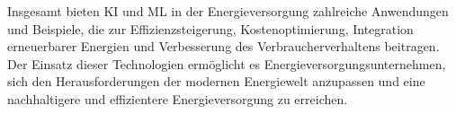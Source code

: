 Insgesamt bieten KI und ML in der Energieversorgung zahlreiche Anwendungen und
Beispiele, die zur Effizienzsteigerung, Kostenoptimierung, Integration
erneuerbarer Energien und Verbesserung des Verbraucherverhaltens beitragen. Der
Einsatz dieser Technologien ermöglicht es Energieversorgungsunternehmen, sich
den Herausforderungen der modernen Energiewelt anzupassen und eine
nachhaltigere und effizientere Energieversorgung zu erreichen.